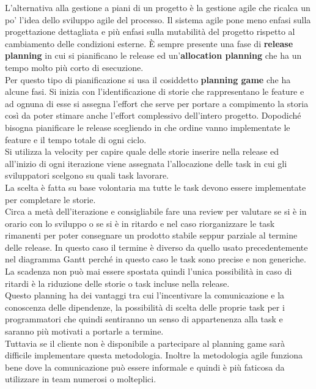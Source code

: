 L'alternativa alla gestione a piani di un progetto è la gestione agile che ricalca un po' l'idea dello sviluppo agile del processo.
Il sistema agile pone meno enfasi sulla progettazione dettagliata e più enfasi sulla mutabilità del progetto rispetto al cambiamento delle condizioni esterne.
È sempre presente una fase di \textbf{release planning} in cui si pianificano le release ed un'\textbf{allocation planning} che ha un tempo molto più corto di esecuzione.\\
Per questo tipo di pianificazione si usa il cosiddetto \textbf{planning game} che ha alcune fasi.
Si inizia con l'identificazione di storie che rappresentano le feature e ad ognuna di esse si assegna l'effort che serve per portare a compimento la storia così da poter stimare anche l'effort complessivo dell'intero progetto.
Dopodiché bisogna pianificare le release scegliendo in che ordine vanno implementate le feature e il tempo totale di ogni ciclo.\\
Si utilizza la velocity per capire quale delle storie inserire nella release ed all'inizio di ogni iterazione viene assegnata l'allocazione delle task in cui gli sviluppatori scelgono su quali task lavorare.\\
La scelta è fatta su base volontaria ma tutte le task devono essere implementate per completare le storie.\\
Circa a metà dell'iterazione e consigliabile fare una review per valutare se si è in orario con lo sviluppo o se si è in ritardo e nel caso riorganizzare le task rimanenti per poter consegnare un prodotto stabile seppur parziale al termine delle release.
In questo caso il termine  è diverso da quello usato precedentemente nel diagramma Gantt perché in questo caso le task sono precise e non generiche.\\
La scadenza non può mai essere spostata quindi l'unica possibilità in caso di ritardi è la riduzione delle storie o task incluse nella release.\\
Questo planning ha dei vantaggi tra cui l'incentivare la comunicazione e la conoscenza delle dipendenze, la possibilità di scelta delle proprie task per i programmatori che quindi sentiranno un senso di appartenenza alla task e saranno più motivati a portarle a termine.\\
Tuttavia se il cliente non è disponibile a partecipare al planning game sarà difficile implementare questa metodologia.
Inoltre la metodologia agile funziona bene dove la comunicazione può essere informale e quindi è più faticosa da utilizzare in team numerosi o molteplici.\\

